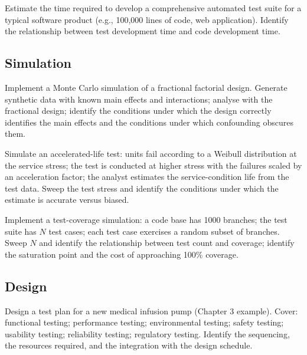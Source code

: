 \begin{exercise}
Estimate the time required to develop a comprehensive automated test suite for a typical software product (e.g., 100{,}000 lines of code, web application). Identify the relationship between test development time and code development time.
\end{exercise}

\subsection*{Simulation}

\begin{exercise}
Implement a Monte Carlo simulation of a fractional factorial design. Generate synthetic data with known main effects and interactions; analyse with the fractional design; identify the conditions under which the design correctly identifies the main effects and the conditions under which confounding obscures them.
\end{exercise}

\begin{exercise}
Simulate an accelerated-life test: units fail according to a Weibull distribution at the service stress; the test is conducted at higher stress with the failures scaled by an acceleration factor; the analyst estimates the service-condition life from the test data. Sweep the test stress and identify the conditions under which the estimate is accurate versus biased.
\end{exercise}

\begin{exercise}
Implement a test-coverage simulation: a code base has 1000 branches; the test suite has $N$ test cases; each test case exercises a random subset of branches. Sweep $N$ and identify the relationship between test count and coverage; identify the saturation point and the cost of approaching 100\% coverage.
\end{exercise}

\subsection*{Design}

\begin{exercise}
Design a test plan for a new medical infusion pump (Chapter 3 example). Cover: functional testing; performance testing; environmental testing; safety testing; usability testing; reliability testing; regulatory testing. Identify the sequencing, the resources required, and the integration with the design schedule.
\end{exercise}

